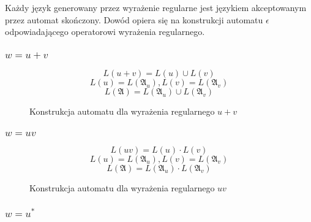 \documentclass{../notatki}
\begin{document}
Każdy język generowany przez wyrażenie regularne jest językiem akceptowanym przez automat skończony.
Dowód opiera się na konstrukcji automatu $\epsilon$ odpowiadającego operatorowi wyrażenia regularnego.

\subsubsection{$w = u + v$}

$$
L(u + v) = L(u) \cup L(v)
$$
$$
L(u) = L(\mathfrak{A}_u), L(v) = L(\mathfrak{A}_v)
$$
$$
L(\mathfrak{A}) = L(\mathfrak{A}_u) \cup L(\mathfrak{A}_v)
$$

\begin{figure}[h!]
    \centering
    \caption{Konstrukcja automatu dla wyrażenia regularnego $u + v$}
    \label{fig:reg:plus}
\end{figure}

\subsubsection{$w = uv$}

$$
L(uv) = L(u) \cdot L(v)
$$
$$
L(u) = L(\mathfrak{A}_u), L(v) = L(\mathfrak{A}_v)
$$
$$
L(\mathfrak{A}) = L(\mathfrak{A}_u) \cdot L(\mathfrak{A}_v)
$$

\begin{figure}[h!]
    \centering
    \caption{Konstrukcja automatu dla wyrażenia regularnego $uv$}
    \label{fig:reg:concat}
\end{figure}

\subsubsection{$w = u^*$}
\end{document}
